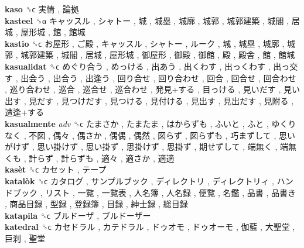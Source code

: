 \textbf{kaso} ␝ϲ   実情 ,  論拠   \\
\textbf{kasteel} ␝α   キャッスル ,  シャトー ,  城 ,  城塁 ,  城廓 ,  城郭 ,  城郭建築 ,  城閣 ,  居城 ,  屋形城 ,  館 ,  館城   \\
\textbf{kastio} ␝ϲ   お屋形 ,  ご殿 ,  キャッスル ,  シャトー ,  ルーク ,  城 ,  城塁 ,  城廓 ,  城郭 ,  城郭建築 ,  城閣 ,  居城 ,  屋形城 ,  御屋形 ,  御殿 ,  御館 ,  殿 ,  殿舎 ,  館 ,  館城   \\
\textbf{kasualidat} ␝ϲ   めぐり合う ,  めっける ,  出あう ,  出くわす ,  出っくわす ,  出っ交す ,  出会う ,  出合う ,  出逢う ,  回り合せ ,  回り合わせ ,  回合 ,  回合せ ,  回合わせ ,  巡り合わせ ,  巡合 ,  巡合せ ,  巡合わせ ,  発見+する ,  目っける ,  見いだす ,  見い出す ,  見だす ,  見つけだす ,  見つける ,  見付ける ,  見出す ,  見出だす ,  見附る ,  遭逢+する   \\
\textbf{kasualmente} \emph{adv}  ␝ϲ   たまさか ,  たまたま ,  はからずも ,  ふいと ,  ふと ,  ゆくりなく ,  不図 ,  偶々 ,  偶さか ,  偶偶 ,  偶然 ,  図らず ,  図らずも ,  巧まずして ,  思いがけず ,  思い掛けず ,  思い掛ず ,  思掛けず ,  思掛ず ,  期せずして ,  端無く ,  端無くも ,  計らず ,  計らずも ,  適々 ,  適さか ,  適適   \\
\textbf{kasèt} ␝ϲ   カセット ,  テープ   \\
\textbf{katalòk} ␝ϲ   カタログ ,  サンプルブック ,  ディレクトリ ,  ディレクトリィ ,  ハンドブック ,  リスト ,  一覧 ,  一覧表 ,  人名簿 ,  人名録 ,  便覧 ,  名鑑 ,  品書 ,  品書き ,  商品目録 ,  型録 ,  登録簿 ,  目録 ,  紳士録 ,  総目録   \\
\textbf{katapila} ␝ϲ   ブルドーザ ,  ブルドーザー   \\
\textbf{katedral} ␝ϲ   カセドラル ,  カテドラル ,  ドゥオモ ,  ドゥオーモ ,  伽藍 ,  大聖堂 ,  巨刹 ,  聖堂   \\
